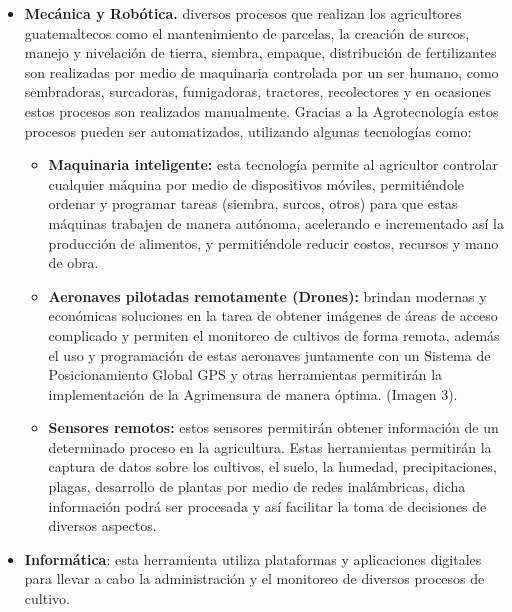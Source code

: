 \documentclass[12pt,spanish,Letterpaper,openany]{book}
\providecommand{\tightlist}{%
  \setlength{\itemsep}{0pt}\setlength{\parskip}{0pt}}
\newcommand{\spacefourmilis}{\vspace{4mm}}
\newcommand{\spaceonemilis}{\vspace{1mm}}
\begin{document}
\spacefourmilis

\begin{itemize}
\tightlist
\item
  \textbf{Mecánica y Robótica.} diversos procesos que realizan los agricultores guatemaltecos como el mantenimiento de parcelas, la creación de surcos, manejo y nivelación de tierra, siembra, empaque, distribución de fertilizantes son realizadas por medio de maquinaria controlada por un ser humano, como sembradoras, surcadoras, fumigadoras, tractores, recolectores y en ocasiones estos procesos son realizados manualmente. Gracias a la Agrotecnología estos procesos pueden ser automatizados, utilizando algunas tecnologías como:
  \spaceonemilis

  \begin{itemize}
  \tightlist
  \item
    \textbf{Maquinaria inteligente:} esta tecnología permite al agricultor controlar cualquier máquina por medio de dispositivos móviles, permitiéndole ordenar y programar tareas (siembra, surcos, otros) para que estas máquinas trabajen de manera autónoma, acelerando e incrementado así la producción de alimentos, y permitiéndole reducir costos, recursos y mano de obra.
    \spaceonemilis
  \item
    \textbf{Aeronaves pilotadas remotamente (Drones):} brindan modernas y económicas soluciones en la tarea de obtener imágenes de áreas de acceso complicado y permiten el monitoreo de cultivos de forma remota, además el uso y programación de estas aeronaves juntamente con un Sistema de Posicionamiento Global GPS y otras herramientas permitirán la implementación de la Agrimensura de manera óptima. (Imagen 3).
    \spaceonemilis
  \item
    \textbf{Sensores remotos:} estos sensores permitirán obtener información de un determinado proceso en la agricultura. Estas herramientas permitirán la captura de datos sobre los cultivos, el suelo, la humedad, precipitaciones, plagas, desarrollo de plantas por medio de redes inalámbricas, dicha información podrá ser procesada y así facilitar la toma de decisiones de diversos aspectos.
    \spaceonemilis
  \end{itemize}
\item
  \textbf{Informática}: esta herramienta utiliza plataformas y aplicaciones digitales para llevar a cabo la administración y el monitoreo de diversos procesos de cultivo.
  \spaceonemilis


\end{itemize}
\end{document}
